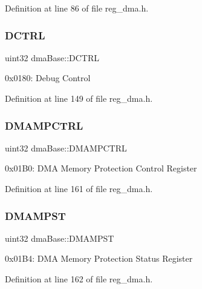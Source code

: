Definition at line 86 of file reg\+\_\+dma.\+h.

\mbox{\label{structdmaBase_a183c15583607608d4442edf491c1dd2d}} 
\subsubsection{\texorpdfstring{D\+C\+T\+RL}{DCTRL}}
{\footnotesize\ttfamily uint32 dma\+Base\+::\+D\+C\+T\+RL}

0x0180\+: Debug Control 

Definition at line 149 of file reg\+\_\+dma.\+h.

\mbox{\label{structdmaBase_a33249066c5b916593b27d751416a9f7f}} 
\subsubsection{\texorpdfstring{D\+M\+A\+M\+P\+C\+T\+RL}{DMAMPCTRL}}
{\footnotesize\ttfamily uint32 dma\+Base\+::\+D\+M\+A\+M\+P\+C\+T\+RL}

0x01\+B0\+: D\+MA Memory Protection Control Register 

Definition at line 161 of file reg\+\_\+dma.\+h.

\mbox{\label{structdmaBase_a6c8287b7a515af17fc13ac11e082ac4e}} 
\subsubsection{\texorpdfstring{D\+M\+A\+M\+P\+ST}{DMAMPST}}
{\footnotesize\ttfamily uint32 dma\+Base\+::\+D\+M\+A\+M\+P\+ST}

0x01\+B4\+: D\+MA Memory Protection Status Register 

Definition at line 162 of file reg\+\_\+dma.\+h.

\mbox{\label{structdmaBase_ae480b0ada7ad2fff8277f793bd7ab5e6}} 
